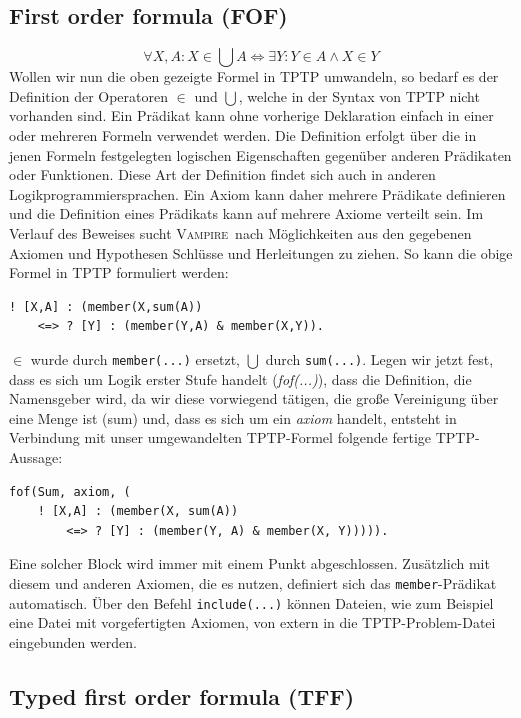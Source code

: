\documentclass{article}
\newcommand{\vampire}{\textsc{Vampire}~}
\begin{document}
\subsection{First order formula (FOF)}
\label{subsec:tptpfof}
\[\forall X,A : X \in \bigcup A \Leftrightarrow \exists Y : Y \in A \land X \in Y\]
Wollen wir nun die oben gezeigte Formel in TPTP umwandeln,
so bedarf es der Definition der Operatoren $\in$ und $\bigcup$, welche in der Syntax von TPTP 
nicht vorhanden sind.
Ein Prädikat kann ohne vorherige Deklaration einfach in einer oder mehreren Formeln 
verwendet werden. 
Die Definition erfolgt über die in jenen Formeln festgelegten logischen Eigenschaften gegenüber 
anderen Prädikaten oder Funktionen. Diese Art der Definition findet sich auch in anderen
Logikprogrammiersprachen.
Ein Axiom kann daher mehrere Prädikate definieren und die Definition eines Prädikats kann 
auf mehrere Axiome verteilt sein.
Im Verlauf des Beweises sucht \vampire nach Möglichkeiten aus den gegebenen Axiomen und Hypothesen Schlüsse und Herleitungen zu ziehen.
So kann die obige Formel in TPTP formuliert werden:
\begin{lstlisting}[language=tptp]
! [X,A] : (member(X,sum(A))
	<=> ? [Y] : (member(Y,A) & member(X,Y)).
\end{lstlisting}
$\in$ wurde durch \verb=member(...)= ersetzt, $\bigcup$ durch \verb=sum(...)=.
Legen wir jetzt fest, dass es sich um Logik erster Stufe handelt (\textit{fof(...)}), dass die Definition, 
die Namensgeber wird, da wir diese vorwiegend tätigen, die große Vereinigung über eine Menge ist (sum) und, dass es sich um ein \textit{axiom} handelt,
entsteht in Verbindung mit unser umgewandelten TPTP-Formel folgende fertige TPTP-Aussage:
\begin{lstlisting}[language=tptp]
fof(Sum, axiom, (	
	! [X,A] : (member(X, sum(A)) 
		<=> ? [Y] : (member(Y, A) & member(X, Y))))).
\end{lstlisting}
Eine solcher Block wird immer mit einem Punkt abgeschlossen.
Zusätzlich mit diesem und anderen Axiomen, die es nutzen, definiert sich das \verb=member=-Prädikat automatisch.
Über den Befehl \verb|include(...)| können Dateien, wie zum Beispiel eine Datei mit vorgefertigten Axiomen, von extern in die TPTP-Problem-Datei eingebunden werden. \cite[S.4-5]{cav2013}

\subsection{Typed first order formula (TFF)}
\label{subsec:tptptff}
\end{document}
